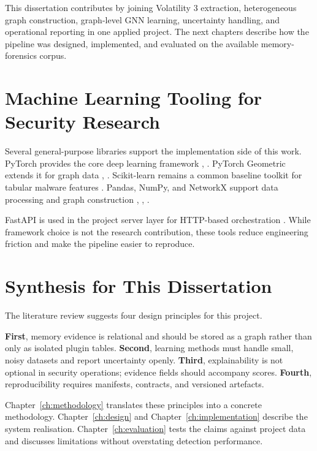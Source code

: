 This dissertation contributes by joining Volatility 3 extraction, heterogeneous graph construction, graph-level GNN learning, uncertainty handling, and operational reporting in one applied project. The next chapters describe how the pipeline was designed, implemented, and evaluated on the available memory-forensics corpus.

\section{Machine Learning Tooling for Security Research}

Several general-purpose libraries support the implementation side of this work. PyTorch provides the core deep learning framework \cite{paszke2019pytorch}, \cite{pytorchdocs2026}. PyTorch Geometric extends it for graph data \cite{fey2019pyg}, \cite{pygdocs2026}. Scikit-learn remains a common baseline toolkit for tabular malware features \cite{pedregosa2011sklearn}. Pandas, NumPy, and NetworkX support data processing and graph construction \cite{mckinney2010pandas}, \cite{harris2020numpy}, \cite{hagberg2008networkx}.

FastAPI is used in the project server layer for HTTP-based orchestration \cite{fastapi2026docs}. While framework choice is not the research contribution, these tools reduce engineering friction and make the pipeline easier to reproduce.

\section{Synthesis for This Dissertation}

The literature review suggests four design principles for this project.

\textbf{First}, memory evidence is relational and should be stored as a graph rather than only as isolated plugin tables. \textbf{Second}, learning methods must handle small, noisy datasets and report uncertainty openly. \textbf{Third}, explainability is not optional in security operations; evidence fields should accompany scores. \textbf{Fourth}, reproducibility requires manifests, contracts, and versioned artefacts.

Chapter~\ref{ch:methodology} translates these principles into a concrete methodology. Chapter~\ref{ch:design} and Chapter~\ref{ch:implementation} describe the system realisation. Chapter~\ref{ch:evaluation} tests the claims against project data and discusses limitations without overstating detection performance.

